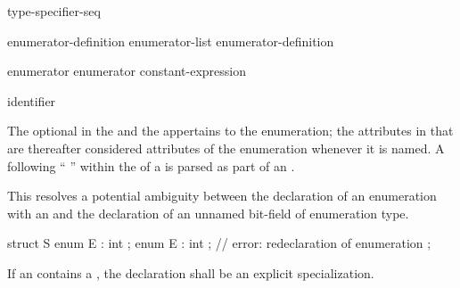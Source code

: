 \begin{bnf}
\br
    \terminal{:} type-specifier-seq
\end{bnf}

\begin{bnf}
\br
    enumerator-definition\br
    enumerator-list \terminal{,} enumerator-definition
\end{bnf}

\begin{bnf}
\br
    enumerator\br
    enumerator \terminal{=} constant-expression
\end{bnf}

\begin{bnf}
\br
    identifier 
\end{bnf}

The optional  in the  and
the  appertains to the enumeration; the attributes
in that  are thereafter considered attributes of the
enumeration whenever it is named.
A \tcode{:} following
``  ''
within the  of a 
is parsed as part of an .
\begin{note} This resolves a potential ambiguity between the declaration of an enumeration
with an  and the declaration of an unnamed bit-field of enumeration
type. \begin{example}

\begin{codeblock}
   struct S {
     enum E : int {};
     enum E : int {};           // error: redeclaration of enumeration
   };
\end{codeblock}

\end{example}
\end{note}
If an  contains
a ,
the declaration shall be an explicit specialization.

